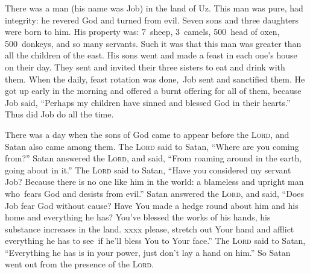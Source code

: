 
\begin{inparaenum}
     There was a man (his name was Job) in the land of Uz. This man was pure, had integrity: he revered God and turned from evil.%
     Seven sons and three daughters were born to him.%
     His property was: 7~sheep, 3~camels, 500~head of oxen, 500~donkeys, and so many servants. Such it was that this man was greater than all the children of the east.%
     His sons went and made a feast in each one's house on their day. They sent and invited their three sisters to eat and drink with them.%
     When the daily, feast rotation was done,\understood\ Job sent and sanctified them. He got up early in the morning and offered a burnt offering for all of them, because Job said, ``Perhaps my children have sinned and blessed God in their hearts.'' Thus did Job do all the time.%
    
     There was a day when the sons of God came to appear before the \textsc{Lord}, and Satan also came among them.%
     The \textsc{Lord} said to Satan, ``Where are you coming from?'' Satan answered the \textsc{Lord}, and said, ``From roaming around in the earth, going about in it.''%
     The \textsc{Lord} said to Satan, ``Have you considered my servant Job? Because there is no one like him in the world: a blameless and upright man who\understood\ fears God and desists from evil.''%
     Satan answered the \textsc{Lord}, and said, ``Does Job fear God without cause?%
     Have You made a hedge round about him and his home and everything he has? You've blessed the works of his hands, his substance increases in the land.%
     xxxx please, stretch out Your hand and afflict everything he has to see\understood\ if he'll bless You to Your face.''%
     The \textsc{Lord} said to Satan, ``Everything he has is in your power, just don't lay a hand on him.'' So Satan went out from the presence of the \textsc{Lord}.%
    

\end{inparaenum}
